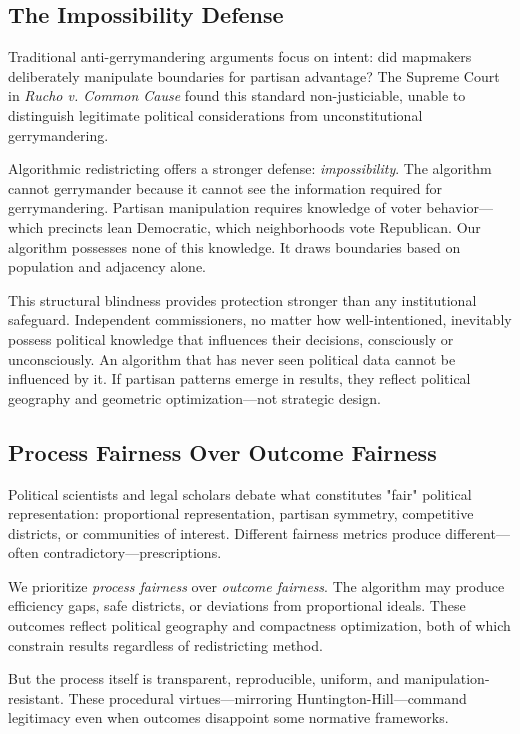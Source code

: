\subsection{The Impossibility Defense}

Traditional anti-gerrymandering arguments focus on intent: did mapmakers deliberately manipulate boundaries for partisan advantage? The Supreme Court in \textit{Rucho v. Common Cause} found this standard non-justiciable, unable to distinguish legitimate political considerations from unconstitutional gerrymandering.

Algorithmic redistricting offers a stronger defense: \textit{impossibility}. The algorithm cannot gerrymander because it cannot see the information required for gerrymandering. Partisan manipulation requires knowledge of voter behavior—which precincts lean Democratic, which neighborhoods vote Republican. Our algorithm possesses none of this knowledge. It draws boundaries based on population and adjacency alone.

This structural blindness provides protection stronger than any institutional safeguard. Independent commissioners, no matter how well-intentioned, inevitably possess political knowledge that influences their decisions, consciously or unconsciously. An algorithm that has never seen political data cannot be influenced by it. If partisan patterns emerge in results, they reflect political geography and geometric optimization—not strategic design.

\subsection{Process Fairness Over Outcome Fairness}

Political scientists and legal scholars debate what constitutes "fair" political representation: proportional representation, partisan symmetry, competitive districts, or communities of interest. Different fairness metrics produce different—often contradictory—prescriptions.

We prioritize \textit{process fairness} over \textit{outcome fairness}. The algorithm may produce efficiency gaps, safe districts, or deviations from proportional ideals. These outcomes reflect political geography and compactness optimization, both of which constrain results regardless of redistricting method.

But the process itself is transparent, reproducible, uniform, and manipulation-resistant. These procedural virtues—mirroring Huntington-Hill—command legitimacy even when outcomes disappoint some normative frameworks.

